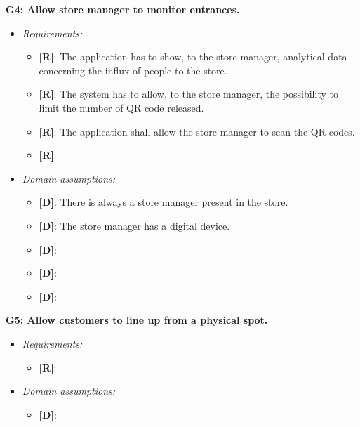 \textbf{G4: Allow store manager to monitor entrances.}
\begin{itemize}
\item \textit{Requirements:}
\begin{itemize}
	\item {\textbf{[R]}}: The application has to show, to the store manager, analytical data concerning the influx of people to the store.
	\item {\textbf{[R]}}: The system has to allow, to the store manager, the possibility to limit the number of QR code released.
	\item {\textbf{[R]}}: The application shall allow the store manager to scan the QR codes.
	\item {\textbf{[R]}}:
\end{itemize}

\item \textit{Domain assumptions:}
\begin{itemize}
	\item {\textbf{[D]}}: There is always a store manager present in the store.
	\item {\textbf{[D]}}: The store manager has a digital device.
	\item {\textbf{[D]}}:
	\item {\textbf{[D]}}:
	\item {\textbf{[D]}}:
\end{itemize}
\end{itemize}

\textbf{G5: Allow customers to line up from a physical spot.}
\begin{itemize}
\item \textit{Requirements:}
\begin{itemize}
	\item {\textbf{[R]}}:
\end{itemize}

\item \textit{Domain assumptions:}
\begin{itemize}
	\item {\textbf{[D]}}:
\end{itemize}
\end{itemize}

